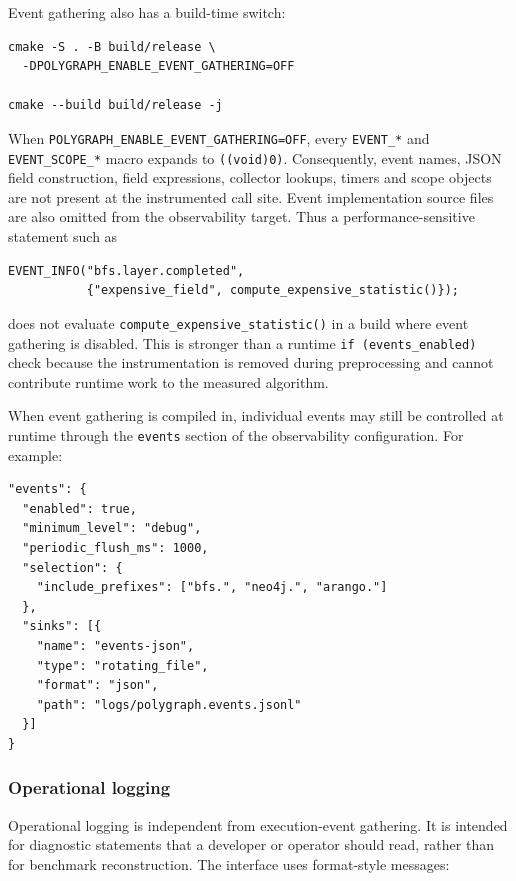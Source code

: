 \documentclass[11pt,a4paper]{article}
\begin{document}
Event gathering also has a build-time switch:

\begin{lstlisting}[style=bash]
cmake -S . -B build/release \
  -DPOLYGRAPH_ENABLE_EVENT_GATHERING=OFF

cmake --build build/release -j
\end{lstlisting}

When \texttt{POLYGRAPH\_ENABLE\_EVENT\_GATHERING=OFF}, every
\texttt{EVENT\_*} and \texttt{EVENT\_SCOPE\_*} macro expands to
\texttt{((void)0)}. Consequently, event names, JSON field construction, field
expressions, collector lookups, timers and scope objects are not present at the
instrumented call site. Event implementation source files are also omitted from
the observability target. Thus a performance-sensitive statement such as

\begin{lstlisting}[style=cpp]
EVENT_INFO("bfs.layer.completed",
           {"expensive_field", compute_expensive_statistic()});
\end{lstlisting}

does not evaluate \texttt{compute\_expensive\_statistic()} in a build where event
gathering is disabled. This is stronger than a runtime
\texttt{if (events\_enabled)} check because the instrumentation is removed during
preprocessing and cannot contribute runtime work to the measured algorithm.

When event gathering is compiled in, individual events may still be controlled at
runtime through the \texttt{events} section of the observability configuration.
For example:

\begin{lstlisting}[style=json]
"events": {
  "enabled": true,
  "minimum_level": "debug",
  "periodic_flush_ms": 1000,
  "selection": {
    "include_prefixes": ["bfs.", "neo4j.", "arango."]
  },
  "sinks": [{
    "name": "events-json",
    "type": "rotating_file",
    "format": "json",
    "path": "logs/polygraph.events.jsonl"
  }]
}
\end{lstlisting}

\subsubsection{Operational logging}

Operational logging is independent from execution-event gathering. It is intended
for diagnostic statements that a developer or operator should read, rather than
for benchmark reconstruction. The interface uses format-style messages:
\end{document}
